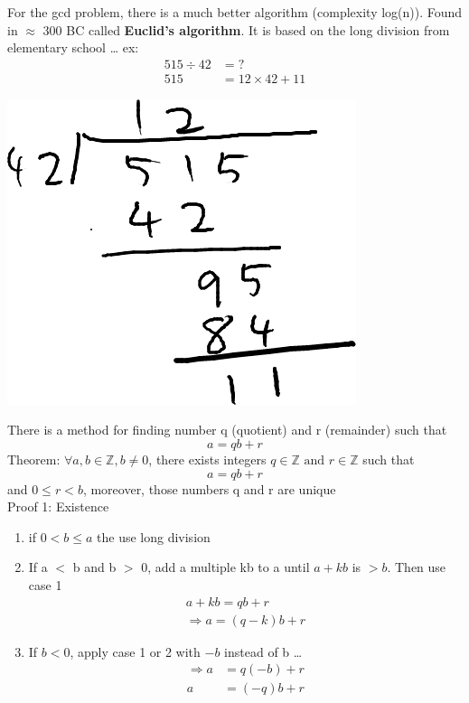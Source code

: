\documentclass{article}
\begin{document}
For the gcd problem, there is a much better algorithm (complexity log(n)). Found in $\approx$ 300 BC called \textbf{Euclid's algorithm}. It is based on the long division from elementary school \dots
ex:
\begin{align*}
    515 \div 42 & = ?                 \\
    515         & = 12 \times 42 + 11
\end{align*}
\begin{center}
    \includegraphics[width=0.7\columnwidth,keepaspectratio]{assets/2023-02-09-21-54-47.png}
\end{center}

There is a method for finding number q (quotient) and r (remainder) such that
\[
    a = qb +r
\]
Theorem: $\forall a,b \in \mathbb{Z}, b \ne 0$, there exists integers $q \in \mathbb{Z} \text{ and } r \in \mathbb{Z} $ such that \[
    a = qb +r
\]
and $0 \le r < b$, moreover, those numbers q and r are unique\\
Proof 1: Existence
\begin{enumerate}
    \item if $0 < b \le a$ the use long division
    \item If a $<$ b and b $>$ 0, add a multiple kb to a until $a+kb$ is $>b$. Then use case 1
          \begin{gather*}
              a+kb = qb+r \\
              \Rightarrow a = (q-k)b+r
          \end{gather*}
    \item If $b<0$, apply case 1 or 2 with $-b$ instead of b \dots
          \begin{align*}
              \Rightarrow a & = q(-b) + r \\
              a             & = (-q)b+r
          \end{align*}
\end{enumerate}
\end{document}
